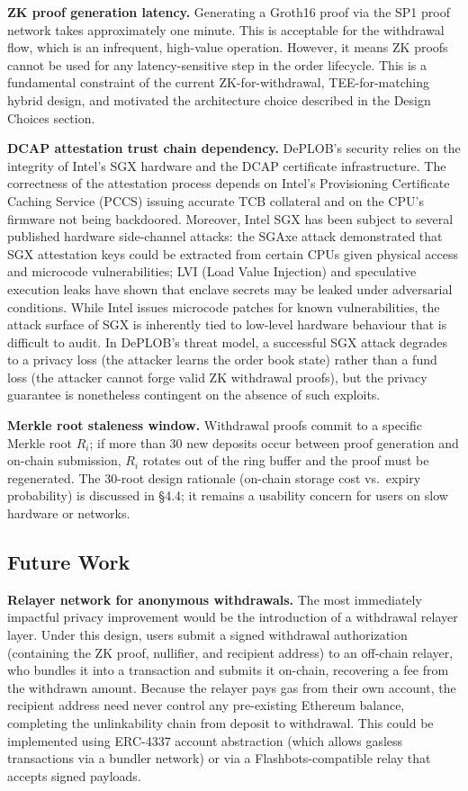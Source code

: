 \documentclass[12pt,a4paper]{article}
\begin{document}
\textbf{ZK proof generation latency.} Generating a Groth16 proof via the SP1 proof network takes approximately one minute. This is acceptable for the withdrawal flow, which is an infrequent, high-value operation. However, it means ZK proofs cannot be used for any latency-sensitive step in the order lifecycle. This is a fundamental constraint of the current ZK-for-withdrawal, TEE-for-matching hybrid design, and motivated the architecture choice described in the Design Choices section.

\textbf{DCAP attestation trust chain dependency.} DePLOB's security relies on the integrity of Intel's SGX hardware and the DCAP certificate infrastructure. The correctness of the attestation process depends on Intel's Provisioning Certificate Caching Service (PCCS) issuing accurate TCB collateral and on the CPU's firmware not being backdoored. Moreover, Intel SGX has been subject to several published hardware side-channel attacks: the SGAxe attack demonstrated that SGX attestation keys could be extracted from certain CPUs given physical access and microcode vulnerabilities; LVI (Load Value Injection) and speculative execution leaks have shown that enclave secrets may be leaked under adversarial conditions. While Intel issues microcode patches for known vulnerabilities, the attack surface of SGX is inherently tied to low-level hardware behaviour that is difficult to audit. In DePLOB's threat model, a successful SGX attack degrades to a privacy loss (the attacker learns the order book state) rather than a fund loss (the attacker cannot forge valid ZK withdrawal proofs), but the privacy guarantee is nonetheless contingent on the absence of such exploits.

\textbf{Merkle root staleness window.} Withdrawal proofs commit to a specific Merkle root $R_i$; if more than 30 new deposits occur between proof generation and on-chain submission, $R_i$ rotates out of the ring buffer and the proof must be regenerated. The 30-root design rationale (on-chain storage cost vs.\ expiry probability) is discussed in §4.4; it remains a usability concern for users on slow hardware or networks.

\subsection{Future Work}

\textbf{Relayer network for anonymous withdrawals.} The most immediately impactful privacy improvement would be the introduction of a withdrawal relayer layer. Under this design, users submit a signed withdrawal authorization (containing the ZK proof, nullifier, and recipient address) to an off-chain relayer, who bundles it into a transaction and submits it on-chain, recovering a fee from the withdrawn amount. Because the relayer pays gas from their own account, the recipient address need never control any pre-existing Ethereum balance, completing the unlinkability chain from deposit to withdrawal. This could be implemented using ERC-4337 account abstraction (which allows gasless transactions via a bundler network) or via a Flashbots-compatible relay that accepts signed payloads.
\end{document}
